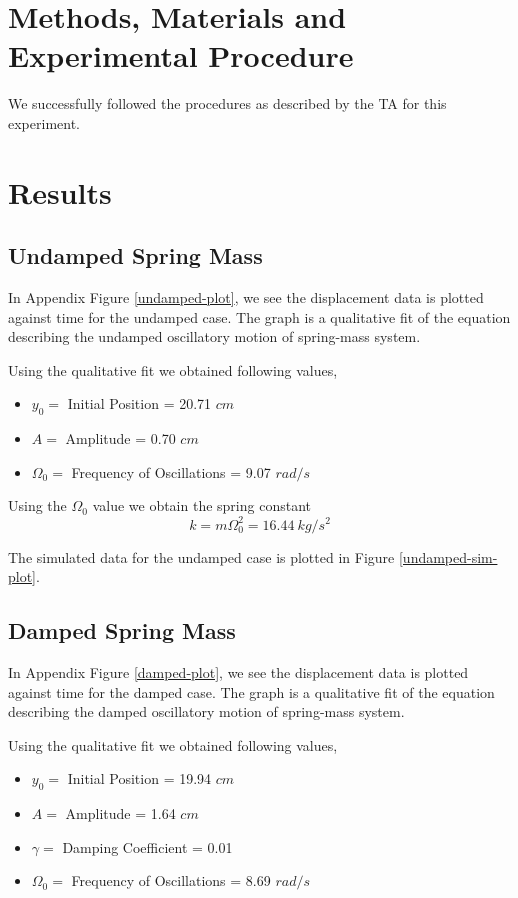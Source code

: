 \documentclass[letterpaper,12pt]{article}
\begin{document}
\section{Methods, Materials and Experimental Procedure}

We successfully followed the procedures as described by the TA for this experiment.

\section{Results}
\subsection{Undamped Spring Mass}

In Appendix Figure \ref{undamped-plot}, we see the displacement data is 
plotted against time for the undamped case. The graph is a qualitative fit 
of the equation describing the undamped oscillatory motion of spring-mass system.

Using the qualitative fit we obtained following values,
\begin{itemize}
  \item[] $y_0=$ Initial Position = 20.71 $cm$
  \item[] $A=$ Amplitude = 0.70 $cm$
  \item[] $\Omega_0=$ Frequency of Oscillations = 9.07 $rad/s$
\end{itemize}

Using the $\Omega_0$ value we obtain the spring constant $$k = m \Omega^2_0 = 16.44\ kg/s^2$$

The simulated data for the undamped case is plotted in Figure \ref{undamped-sim-plot}. 

\subsection{Damped Spring Mass}

In Appendix Figure \ref{damped-plot}, we see the displacement data is 
plotted against time for the damped case. The graph is a qualitative fit 
of the equation describing the damped oscillatory motion of spring-mass system.

Using the qualitative fit we obtained following values,
\begin{itemize}
  \item[] $y_0=$ Initial Position = 19.94 $cm$
  \item[] $A=$ Amplitude = 1.64 $cm$
  \item[] $\gamma=$ Damping Coefficient = 0.01
  \item[] $\Omega_0=$ Frequency of Oscillations = 8.69 $rad/s$
\end{itemize}
\end{document}
